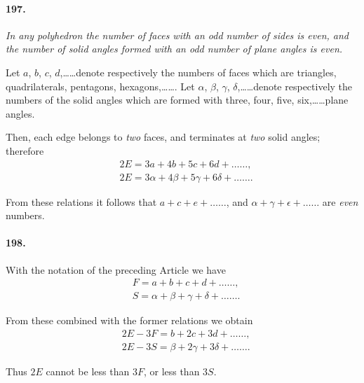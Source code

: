 \documentclass{book}[2004/02/16]
\begin{document}
\begin{mainmatter}
\begin{spacing}{1.3}
\paragraph{197.} \textit{In any polyhedron the number of faces with an odd
number of sides is even, and the number of solid angles formed
with an odd number of plane angles is even.}

Let $a$, $b$, $c$, $d$,\ldots\ldots denote respectively the numbers of faces
which are triangles, quadrilaterals, pentagons, hexagons,\ldots\ldots.
Let $\alpha$, $\beta$, $\gamma$, $\delta$,\ldots\ldots denote respectively the numbers of the solid
angles which are formed with three, four, five, six,\ldots\ldots plane
angles.

Then, each edge belongs to \textit{two} faces, and terminates at \textit{two}
solid angles; therefore
\begin{align*}
  & 2E=3a+4b+5c+6d+ \ldots\ldots, \\
  & 2E= 3 \alpha + 4 \beta + 5 \gamma + 6 \delta + \ldots\ldots.
\end{align*}

From these relations it follows that $a + c + e + \ldots\ldots$, and
$\alpha + \gamma + \epsilon + \ldots\ldots$ are \textit{even} numbers.

\paragraph{198.} With the notation of the preceding Article we have
\begin{align*}
  & F=a+b+c+d+ \ldots\ldots, \\
  & S= \alpha + \beta + \gamma + \delta + \ldots\ldots.
\end{align*}

From these combined with the former relations we obtain
\begin{align*}
  & 2E-3F = b + 2c + 3d + \ldots\ldots, \\
  & 2E-3S = \beta + 2 \gamma + 3 \delta + \ldots\ldots.
\end{align*}

Thus $2E$ cannot be less than $3F$, or less than $3S$.


\end{spacing}
\end{mainmatter}
\end{document}
